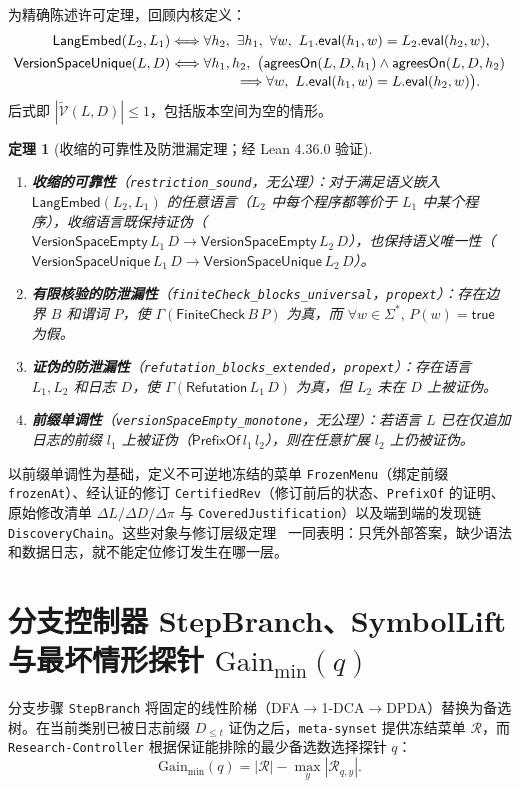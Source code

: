 \documentclass[11pt,a4paper,UTF8,fontset=fandol]{ctexart}
\newtheorem{theorem}{定理}[section]
\DeclareRobustCommand{\id}[1]{\nolinkurl{#1}}
\begin{document}
为精确陈述许可定理，回顾内核定义：
\begin{align*}
\mathsf{LangEmbed}(L_2,L_1)&\Longleftrightarrow
\forall h_2,\ \exists h_1,\ \forall w,\ L_1.\mathsf{eval}(h_1,w)=L_2.\mathsf{eval}(h_2,w),\\
\mathsf{VersionSpaceUnique}(L,D)&\Longleftrightarrow \forall h_1,h_2,\ \bigl(
\mathsf{agreesOn}(L,D,h_1)\land\mathsf{agreesOn}(L,D,h_2)\\[-.3em]
&\hspace{4.7em}\Longrightarrow \forall w,\ L.\mathsf{eval}(h_1,w)=L.\mathsf{eval}(h_2,w)\bigr).
\end{align*}
后式即 $|\widetilde{\mathcal V}(L,D)|\le1$，包括版本空间为空的情形。

\begin{theorem}[收缩的可靠性及防泄漏定理；经 Lean 4.36.0 验证]
\begin{enumerate}
\item \textbf{收缩的可靠性}（\id{restriction_sound}，无公理）：对于满足语义嵌入 $\mathsf{LangEmbed}(L_2,L_1)$ 的任意语言（$L_2$ 中每个程序都等价于 $L_1$ 中某个程序），收缩语言既保持证伪（$\mathsf{VersionSpaceEmpty}\,L_1\,D\to\mathsf{VersionSpaceEmpty}\,L_2\,D$），也保持语义唯一性（$\mathsf{VersionSpaceUnique}\,L_1\,D\to\mathsf{VersionSpaceUnique}\,L_2\,D$）。
\item \textbf{有限核验的防泄漏性}（\id{finiteCheck_blocks_universal}，\id{propext}）：存在边界 $B$ 和谓词 $P$，使 $\Gamma(\mathsf{FiniteCheck}\,B\,P)$ 为真，而 $\forall w\in\Sigma^*,\,P(w)=\mathsf{true}$ 为假。
\item \textbf{证伪的防泄漏性}（\id{refutation_blocks_extended}，\id{propext}）：存在语言 $L_1,L_2$ 和日志 $D$，使 $\Gamma(\mathsf{Refutation}\,L_1\,D)$ 为真，但 $L_2$ 未在 $D$ 上被证伪。
\item \textbf{前缀单调性}（\id{versionSpaceEmpty_monotone}，无公理）：若语言 $L$ 已在仅追加日志的前缀 $l_1$ 上被证伪（$\mathsf{PrefixOf}\,l_1\,l_2$），则在任意扩展 $l_2$ 上仍被证伪。
\end{enumerate}
\end{theorem}

以前缀单调性为基础，定义不可逆地冻结的菜单 \id{FrozenMenu}（绑定前缀 \id{frozenAt}）、经认证的修订 \id{CertifiedRev}（修订前后的状态、\id{PrefixOf} 的证明、原始修改清单 $\Delta L/\Delta D/\Delta\pi$ 与 \id{CoveredJustification}）以及端到端的发现链 \id{DiscoveryChain}。这些对象与修订层级定理~\cite[定理 3]{ms2} 一同表明：只凭外部答案，缺少语法和数据日志，就不能定位修订发生在哪一层。

\section{分支控制器 StepBranch、SymbolLift 与最坏情形探针 \texorpdfstring{$\mathrm{Gain}_{\min}(q)$}{Gain min(q)}}
分支步骤 \id{StepBranch} 将固定的线性阶梯（DFA$\to$1-DCA$\to$DPDA）替换为备选树。在当前类别已被日志前缀 $D_{\le t}$ 证伪之后，\id{meta-synset} 提供冻结菜单 $\mathcal R$，而 \id{Research-Controller} 根据保证能排除的最少备选数选择探针 $q$：
\begin{equation}
\mathrm{Gain}_{\min}(q)=|\mathcal R|-\max_y |\mathcal R_{q,y}|.
\end{equation}
\end{document}
